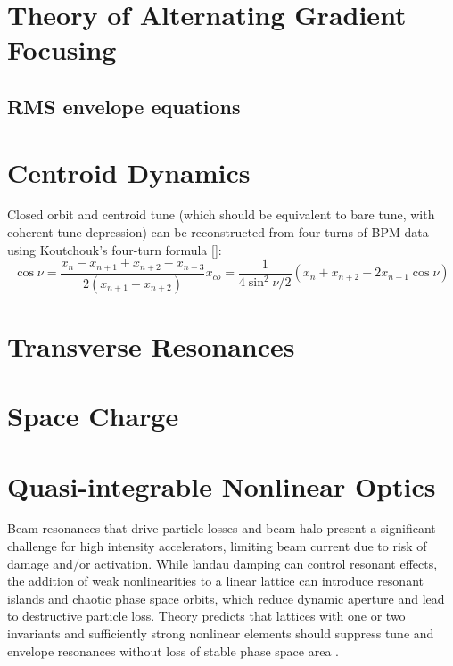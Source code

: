 
\renewcommand{\thechapter}{2}

\section{Theory of Alternating Gradient Focusing}
	\subsection{RMS envelope equations}



	\section{Centroid Dynamics}


Closed orbit and centroid tune (which should be equivalent to bare tune, with coherent tune depression) can be reconstructed from four turns of BPM data using Koutchouk's four-turn formula [\cite{Koutchouk}]:
\begin{subequations}
\begin{equation}
\label{}
\cos \nu = \frac{x_n - x_{n+1} + x_{n+2} - x_{n+3}}{2(x_{n+1}-x_{n+2})}
\end{equation}
\begin{equation}
\label{}
x_{co} = \frac{1}{4\sin ^2 \nu/2}(x_n+x_{n+2}-2x_{n+1}\cos \nu)
\end{equation}
\end{subequations}
	
\section{Transverse Resonances}

\section{Space Charge}

\section{Quasi-integrable Nonlinear Optics}

Beam resonances that drive particle losses and beam halo present a significant challenge for high intensity accelerators, limiting beam current due to risk of damage and/or activation. While landau damping can control resonant effects, the addition of weak nonlinearities to a linear lattice can introduce resonant islands and chaotic phase space orbits, which reduce dynamic aperture and lead to destructive particle loss. Theory predicts that lattices with one or two invariants and sufficiently strong nonlinear elements should suppress tune and envelope resonances without loss of stable phase space area \cite{DN}. 

